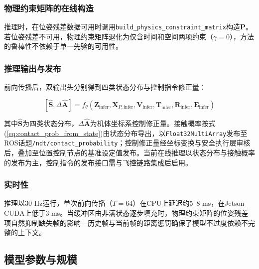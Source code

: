 \subsubsection{物理约束矩阵的在线构造}

推理时，在位姿残差数据可用时调用\texttt{build\_physics\_constraint\_matrix}构造$\mathbf{P}$。若位姿残差不可用，物理约束矩阵退化为仅含时间和空间两项约束（$\gamma = 0$），方法的鲁棒性不依赖于单一先验的可用性。

\subsubsection{推理输出与发布}

前向传播后，双输出头分别得到四类状态分布与控制指令修正量：

\begin{equation}
\left[\hat{\mathbf{S}}, \Delta\hat{\mathbf{A}}\right] = f_\theta(\mathbf{Z}_{\text{infer}}, \mathbf{X}_{P,\text{infer}}, \mathbf{V}_{\text{infer}}, \mathbf{T}_{\text{infer}}, \mathbf{R}_{\text{infer}}, \mathbf{E}_{\text{infer}})
\label{eq:inference_output}
\end{equation}

其中$\hat{\mathbf{S}}$为四类状态分布，$\Delta\hat{\mathbf{A}}$为机体坐标系控制修正量。接触概率按式(\ref{eq:contact_prob_from_state})由状态分布导出，以\texttt{Float32MultiArray}发布至ROS话题\texttt{/ndt/contact\_probability}；控制修正量经坐标变换与安全执行层审核后，叠加至位置控制节点的基准设定值发布。当前在线推理以状态分布与接触概率的发布为主，控制指令的发布接口需与飞控链路集成后启用。

\subsubsection{实时性}

推理以30 Hz运行，单次前向传播（$T = 64$）在CPU上延迟约5--8 ms，在Jetson CUDA上低于3 ms。当缓冲区由非满状态逐步填充时，物理约束矩阵的位姿残差项自然抑制缺失帧的影响---历史帧与当前帧的距离惩罚确保了模型不过度依赖不完整的上下文。

\subsection{模型参数与规模}


